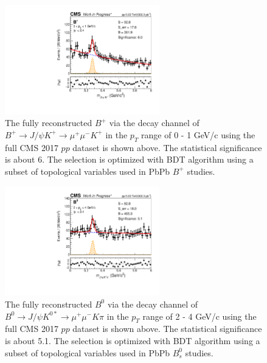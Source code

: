 \begin{figure}[hbtp]
\begin{center}
\includegraphics[width=0.60\textwidth]{Figures/Chapter6/BPLow.pdf}
\caption{The fully reconstructed $B^+$ via the decay channel of $B^+\rightarrow J/\psi K^+ \rightarrow \mu^+\mu^- K^+$ in the $p_T$ range of 0 - 1 GeV/c using the full CMS 2017 $pp$ dataset is shown above. The statistical significance is about 6. The selection is optimized with BDT algorithm using a subset of topological variables used in PbPb $B^+$ studies.}
\label{BPLow}
\end{center}
\end{figure}   
 
 \begin{figure}[hbtp]
\begin{center}
\includegraphics[width=0.60\textwidth]{Figures/Chapter6/BZLow.pdf}
\caption{The fully reconstructed $B^0$ via the decay channel of $B^0\rightarrow J/\psi K^{0*} \rightarrow \mu^+\mu^- K \pi$ in the $p_T$ range of 2 - 4 GeV/c using the full CMS 2017 $pp$ dataset is shown above. The statistical significance is about 5.1. The selection is optimized with BDT algorithm using a subset of topological variables used in PbPb $B^0_s$ studies.}
\label{BZLow}
\end{center}
\end{figure}   

